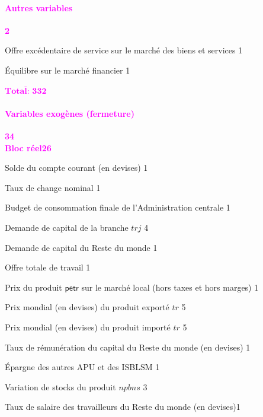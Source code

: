 \documentclass[11pt,a4paper]{article}
\newcommand{\trj}{\mathit{trj}}
\newcommand{\npbns}{\mathit{npbns}}
\newcommand{\CAB}{\mathit{CAB}}
\newcommand{\CG}{\mathit{CG}}
\newcommand{\KD}{\mathit{KD}}
\newcommand{\LEON}{\mathit{LEON}}
\newcommand{\LEONF}{\mathit{LEONF}}
\newcommand{\LS}{\mathit{LS}}
\newcommand{\SNG}{\mathit{SNG}}
\newcommand{\PL}{\mathit{PL}}
\newcommand{\PWE}{\mathit{PWE}}
\newcommand{\PWM}{\mathit{PWM}}
\newcommand{\pub}{\mathsf{pub}}
\newcommand{\petr}{\mathsf{petr}}
\newcommand{\tr}{\mathit{tr}}
\newcommand{\VSTK}{\mathit{VSTK}}
\newcommand{\redparagraph}[1]{\paragraph*{\large\textcolor{Fuchsia}{#1}}}
\begin{document}
	\redparagraph{Autres variables}\hfill \textcolor{Fuchsia}{\textbf{2}} 
	\begin{description}[leftmargin=!,labelwidth=\widthof{\bfseries AAAAAAA}]
		\item[$\LEON$]  Offre excédentaire de service sur le marché des biens et services \hfill 1
		
		\item[$\LEONF$] Équilibre sur le marché financier \hfill 1
		
		\hfill \textcolor{Fuchsia}{$\overline{\textbf{Total: 332}}$}
	\end{description}
	\redparagraph{Variables exogènes (fermeture)}\hfill \textcolor{Fuchsia}{\textbf{34}}\\
	\textcolor{Fuchsia}{\textbf{Bloc réel}}\hfill \textcolor{Fuchsia}{\textbf{26}}
	\begin{description}[leftmargin=!,labelwidth=\widthof{\bfseries AAAAAAAA},parsep=10pt]	
		\item[$\CAB$]			Solde du compte courant  (en devises)			\hfill 1
		\item[$e$]				Taux de change nominal 				\hfill 1
		\item[$\CG_{\pub}$]		Budget de consommation finale de l'Administration centrale	\hfill 1
		\item[$\KD_{\trj}$]		Demande de capital de la branche $\trj$ 		\hfill 4
		\item[$\KD^R$]			Demande de capital du Reste du monde 	\hfill 1
		\item[$\LS$]			Offre totale de travail  	\hfill 1
		\item[$\PL_{\petr}$]	Prix du produit $\petr$ sur le marché local (hors taxes et hors marges)	\hfill 1
		\item[$\PWE_{\tr}$]		Prix mondial (en devises) du produit exporté $\tr$ 		\hfill 5
		\item[$\PWM_{\tr}$]		Prix mondial (en devises) du produit importé $\tr$ 		\hfill 5
		\item[$R^R$]			Taux de rémunération du capital du Reste du monde (en devises) 	\hfill 1
		\item[$\SNG$]			Épargne des autres APU et des ISBLSM 	\hfill 1
		\item[$\VSTK_{\npbns}$]	Variation de stocks du produit $\npbns$	\hfill 3
		\item[$W^R$]			Taux de salaire des travailleurs du Reste du monde (en devises)\hfill 1
	\end{description}
	
\end{document}
